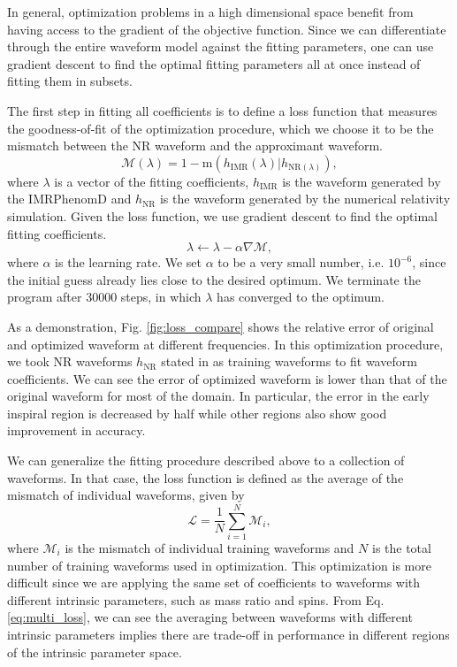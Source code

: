 \documentclass[twocolumn]{aastex631}
\begin{document}
In general, optimization problems in a high dimensional space benefit from
having access to the gradient of the objective function. Since we can
differentiate through the entire waveform model against the fitting parameters,
one can use gradient descent to find the optimal fitting parameters all at once
instead of fitting them in subsets.




The first step in fitting all coefficients is to define a loss function that
measures the goodness-of-fit of the optimization procedure, which we choose it
to be the mismatch between the NR waveform and the approximant waveform.
\begin{equation}
    \label{eq:mismatch}
	\mathcal{M}(\lambda)=1-\mathrm{m}(h_{\mathrm{IMR}}(\lambda)|h_{\mathrm{NR}(\lambda)}),
\end{equation}
where $\lambda$ is a vector of the fitting coefficients, $h_{\mathrm{IMR}}$ is
the waveform generated by the IMRPhenomD and $h_{\mathrm{NR}}$ is the waveform
generated by the numerical relativity simulation. 
Given the loss function, we use gradient descent to find the optimal fitting
coefficients.
\begin{equation}
	\lambda\leftarrow\lambda-\alpha\nabla\mathcal{M}, 
\end{equation}
where $\alpha$ is the learning rate. We set $\alpha$ to be a very small number, i.e. $10^{-6}$, since the initial guess already lies close to the desired optimum. We terminate the program after 30000 steps, in which $\lambda$ has converged to the optimum. 

As a demonstration, Fig. \ref{fig:loss_compare} shows the relative error of
original and optimized waveform at different frequencies. In this optimization
procedure, we took NR waveforms $h_{\mathrm{NR}}$ stated in \citep{Khan:2015jqa}
as training waveforms to fit waveform coefficients.   
We can see the error of optimized waveform is lower than that of the original waveform for most of the domain.
In particular, the error in the early inspiral region is decreased by half while other regions also show good improvement in accuracy. 

We can generalize the fitting procedure described above to a collection of waveforms.
In that case, the loss function is defined as the average of the mismatch of
individual waveforms, given by
\begin{equation}
	\mathcal{L}=\frac{1}{N}\sum_{i=1}^{N}\mathcal{M}_i,
    \label{eq:multi_loss}
\end{equation}
where $\mathcal{M}_i$ is the mismatch of individual training waveforms and $N$
is the total number of training waveforms used in optimization. This
optimization is more difficult since we are applying the same set of
coefficients to waveforms with different intrinsic parameters, such as mass
ratio and spins. From Eq. \ref{eq:multi_loss}, we can see the averaging between
waveforms with different intrinsic parameters implies there are trade-off in
performance in different regions of the intrinsic parameter space.
\end{document}
